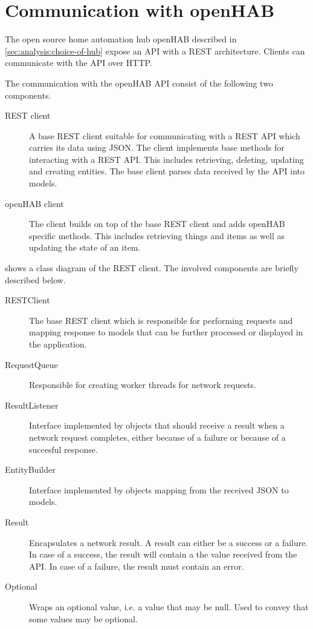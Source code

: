 \section{Communication with openHAB}
\label{sec:design:communication-with-openhab}

The open source home automation hub openHAB described in \cref{sec:analysis:choice-of-hub} expose an API with a REST architecture. Clients can communicate with the API over HTTP.

The communication with the openHAB API consist of the following two components.

\begin{description}
\item[REST client] A base REST client suitable for communicating with a REST API which carries its data using JSON. The client implements base methods for interacting with a REST API. This includes retrieving, deleting, updating and creating entities. The base client parses data received by the API into models.
\item[openHAB client] The client builds on top of the base REST client and adds openHAB specific methods. This includes retrieving things and items as well as updating the state of an item.
\end{description}

 shows a class diagram of the REST client. The involved components are briefly described below.

\begin{description}
\item[RESTClient] The base REST client which is responsible for performing requests and mapping response to models that can be further processed or displayed in the application.
\item[RequestQueue] Responsible for creating worker threads for network requests.
\item[ResultListener] Interface implemented by objects that should receive a result when a network request completes, either because of a failure or because of a succesful response.
\item[EntityBuilder] Interface implemented by objects mapping from the received JSON to models.
\item[Result] Encapsulates a network result. A result can either be a success or a failure. In case of a success, the result will contain a the value received from the API. In case of a failure, the result must contain an error.
\item[Optional] Wraps an optional value, i.e. a value that may be null. Used to convey that some values may be optional.
\end{description}

